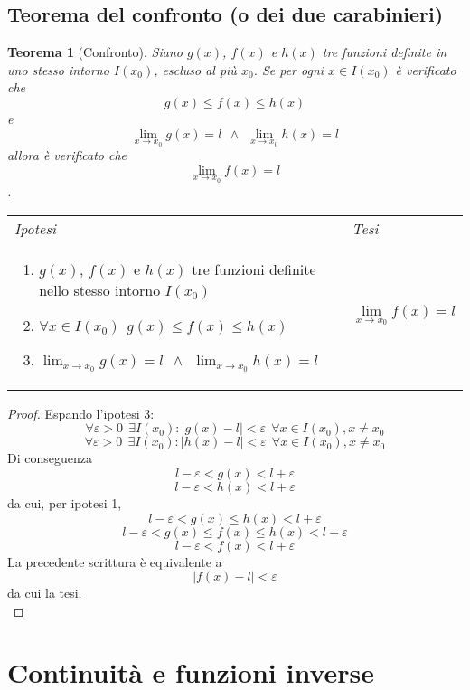 \documentclass{article}     %
\newtheorem*{theorem}{Teorema}
\newenvironment{shadedTheorem}%
  {\begin{mdframed}[backgroundcolor=lightgray!40, linecolor=white, innertopmargin=4pt, innerbottommargin=13pt]\begin{theorem}}%
  {\end{theorem}\end{mdframed}}
\begin{document}
    \subsection{Teorema del confronto (o dei due carabinieri)}
        \begin{shadedTheorem}[Confronto]
            Siano $g(x)$, $f(x)$ e $h(x)$ tre funzioni definite in uno stesso intorno $I(x_0)$, escluso al più $x_0$. Se per ogni $x\in I(x_0)$ è verificato che \[g(x)\leq f(x) \leq h(x)\]
            e \[\lim_{x\rightarrow x_0} g(x)=l ~~ \land ~~ \lim_{x\rightarrow x_0} h(x)=l\]
            allora è verificato che
            \[\lim_{x\rightarrow x_0} f(x)=l\].
        \end{shadedTheorem}
        \begin{tabular}{m{}m{}}
            \textit{Ipotesi} & \textit{Tesi}  \\
            \begin{enumerate}
                \item $g(x)$, $f(x)$ e $h(x)$ tre funzioni definite nello stesso intorno $I(x_0)$
                \item $\forall x \in I(x_0) ~~ g(x)\leq f(x) \leq h(x)$
                \item $\displaystyle\lim_{x\rightarrow x_0} g(x)=l ~~ \land ~~ \lim_{x\rightarrow x_0} h(x)=l$
            \end{enumerate} & \[\lim_{x\rightarrow x_0} f(x)=l\]\\
        \end{tabular}
        
        \begin{proof}
            Espando l'ipotesi 3:
            \[\forall \varepsilon > 0 ~~\exists I(x_0) : |g(x)-l|<\varepsilon~~\forall x \in I(x_0), x\neq x_0\]
            \[\forall \varepsilon > 0 ~~\exists I(x_0) : |h(x)-l|<\varepsilon~~\forall x \in I(x_0), x\neq x_0\]
            Di conseguenza 
            \[l-\varepsilon < g(x) <l+\varepsilon\]
            \[l-\varepsilon < h(x) <l+\varepsilon\]
            da cui, per ipotesi 1, 
            \[l-\varepsilon < g(x)\leq h(x) <l+\varepsilon\]
            \[l-\varepsilon < g(x) \leq f(x) \leq h(x) <l+\varepsilon\]
            \[l-\varepsilon < f(x) <l+\varepsilon\]
            La precedente scrittura è equivalente a 
            \[|f(x)-l|<\varepsilon\]
            da cui la tesi.\\
        \end{proof}
    
\section{Continuità e funzioni inverse}
\end{document}

